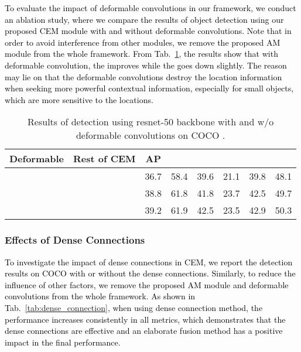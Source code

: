 \documentclass[journal]{IEEEtran}
\def\qcr{\fontfamily{qcr}\selectfont}
\def\qi{\textcolor{black}}
\def\myblue{\textcolor{black}}
\begin{document}
	
	
	
	\qi{
		To \myblue{evaluate the impact} of deformable convolutions in our framework, we conduct an ablation study, where we compare the results of object detection using our proposed CEM module with and without deformable convolutions.
		Note that in order to \myblue{avoid interference from other modules}, we remove the proposed AM module from the whole framework.
		From Tab.~\ref{tab:deformable}, the results show that with deformable convolution,
		\myblue{the  improves while the  goes down slightly.}
The reason may lie on that the deformable convolutions destroy the location information
when seeking more powerful contextual information, especially for small objects, which are more sensitive to the locations.
	}
	
	
	\begin{table}[t]
		\centering
\caption{Results of detection using resnet-50 backbone with and w/o deformable convolutions on COCO {\qcr{minival}}.}
		\resizebox{1.0\linewidth}{!}
		{
			\begin{tabular}{cc|cccccc}
				\toprule
				Deformable & Rest of CEM & AP &  &  &  &  &  \\
				\hline
				&  & 36.7 & 58.4 & 39.6 & 21.1  & 39.8 &  48.1 \\
				&    &  38.8  & 61.8  & 41.8  & 23.7  & 42.5  & 49.7 \\
				   &          & 39.2  & 61.9  & 42.5  & 23.5  & 42.9  & 50.3 \\
				\bottomrule
			\end{tabular}}
		\label{tab:deformable}\end{table}

	
	
	\subsubsection{Effects of Dense Connections}
	
	\qi{
		To investigate the impact of dense connections in CEM, we report the detection results on COCO {\qcr{minival}} with or without the dense connections. \myblue{Similarly}, to reduce the influence of other factors, we remove the proposed AM module and deformable convolutions from the whole framework. As shown in Tab.~\ref{tab:dense_connection}, when using dense connection method, the performance increases consistently in all metrics, which demonstrates that the dense connections are effective and an elaborate fusion method has a positive impact in the final performance.
	}
	
\end{document}
